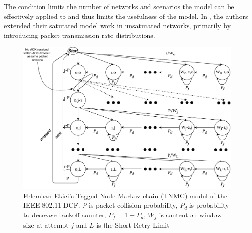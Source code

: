 The condition limits the number of networks and scenarios the model can be
effectively applied to and thus limits the usefulness of the model. In
\cite{felemban}, the authors extended their saturated model work in
unsaturated networks, primarily by introducing packet transmission rate
distributions.

\begin{figure}
\center
\includegraphics[width=1\textwidth]{images/tnmc-dcf.pdf}
\caption{Felemban-Ekici's Tagged-Node Markov chain (TNMC) model of the IEEE 802.11 DCF. $P$ is packet collision probability, $P_d$ is probability to decrease backoff counter, $P_f = 1 - P_d$, $W_j$ is contention window size at attempt $j$ and $L$ is the Short Retry Limit}
\label{fig:tnmc}
\end{figure}
